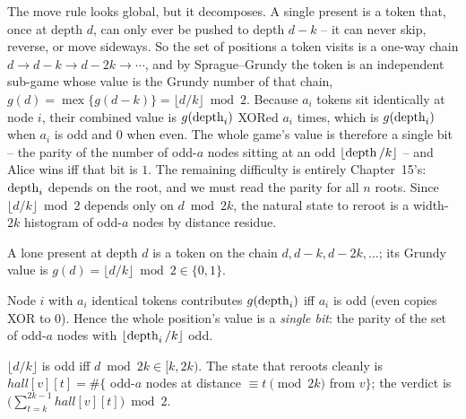 The move rule looks global, but it decomposes. A single present is a token that,
once at depth $d$, can only ever be pushed to depth $d-k$ -- it can never skip,
reverse, or move sideways. So the set of positions a token visits is a one-way
chain $d \to d-k \to d-2k \to \cdots$, and by Sprague--Grundy the token is an
independent sub-game whose value is the Grundy number of that chain,
$g(d) = \operatorname{mex}\{g(d-k)\} = \lfloor d/k\rfloor \bmod 2$. Because $a_i$ tokens
sit identically at node $i$, their combined value is $g(\operatorname{depth}_i)$ XORed $a_i$ times,
which is $g(\operatorname{depth}_i)$ when $a_i$ is odd and $0$ when even. The whole game's value is
therefore a single bit -- the parity of the number of odd-$a$ nodes sitting at an
odd $\lfloor\operatorname{depth}/k\rfloor$ -- and Alice wins iff that bit is $1$. The remaining
difficulty is entirely Chapter~15's: $\operatorname{depth}_i$ depends on the root, and we must
read the parity for all $n$ roots. Since $\lfloor d/k\rfloor \bmod 2$ depends only on
$d \bmod 2k$, the natural state to reroot is a width-$2k$ histogram of odd-$a$
nodes by distance residue.

\begin{observation}
A lone present at depth $d$ is a token on the chain $d, d{-}k, d{-}2k, \dots$; its
Grundy value is $g(d)=\lfloor d/k\rfloor \bmod 2 \in \{0,1\}$.
\end{observation}
\begin{observation}
Node $i$ with $a_i$ identical tokens contributes $g(\operatorname{depth}_i)$ iff $a_i$ is odd
(even copies XOR to $0$). Hence the whole position's value is a \emph{single bit}:
the parity of the set of odd-$a$ nodes with $\lfloor\operatorname{depth}_i/k\rfloor$ odd.
\end{observation}
\begin{observation}
$\lfloor d/k\rfloor$ is odd iff $d \bmod 2k \in [k, 2k)$. The state that reroots
cleanly is $\mathit{hall}[v][t] = \#\{$ odd-$a$ nodes at distance $\equiv t \pmod{2k}$
from $v\}$; the verdict is $\bigl(\sum_{t=k}^{2k-1}\mathit{hall}[v][t]\bigr) \bmod 2$.
\end{observation}

